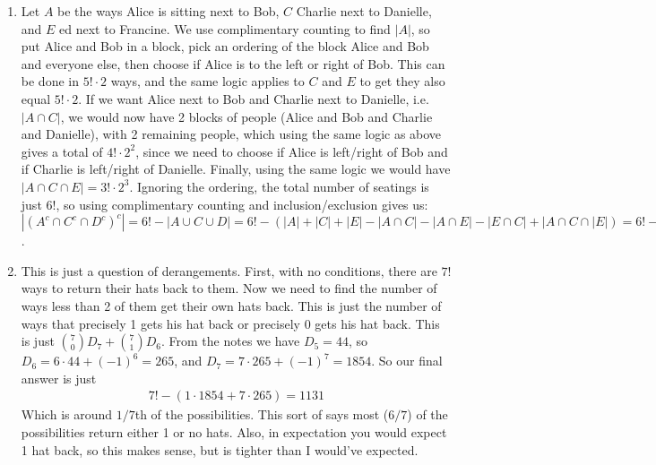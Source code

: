 \documentclass[12pt]{article}
\theoremstyle{definitionstyle}
\begin{document}
\begin{enumerate}[leftmargin=\labelsep]
		\item Let $A$ be the ways Alice is sitting next to Bob, $C$ Charlie next to Danielle, and $E$ ed next to Francine. We use complimentary counting to find $|A|$, so put Alice and Bob in a block, pick an ordering of the block Alice and Bob and everyone else, then choose if Alice is to the left or right of Bob. This can be done in $5! \cdot 2$ ways, and the same logic applies to $C$ and $E$ to get they also equal $5! \cdot 2$. If we want Alice next to Bob and Charlie next to Danielle, i.e. $|A \cap C|$, we would now have 2 blocks of people (Alice and Bob and Charlie and Danielle), with 2 remaining people, which using the same logic as above gives a total of $4! \cdot 2^2$, since we need to choose if Alice is left/right of Bob and if Charlie is left/right of Danielle. Finally, using the same logic we would have $|A \cap C \cap E| = 3! \cdot 2^3$. Ignoring the ordering, the total number of seatings is just $6!$, so using complimentary counting and inclusion/exclusion gives us:
		$|(A^c \cap C^c \cap D^c)^c| = 6! - |A \cup C \cup D| = 6! - (|A| + |C| + |E| - |A \cap C| - |A \cap E| - |E \cap C| + |A \cap C \cap |E|) = 6! - (3 \cdot 5! \cdot 2 - 3 \cdot 4! \cdot 2^2 + 3! \cdot 2^3) = 240$.
		
		\item This is just a question of derangements. First, with no conditions, there are $7!$ ways to return their hats back to them. Now we need to find the number of ways less than 2 of them get their own hats back. This is just the number of ways that precisely 1 gets his hat back or precisely 0 gets his hat back. This is just ${7 \choose 0}D_7 + {7 \choose 1}D_6$. From the notes we have $D_5 = 44$, so $D_6 = 6 \cdot 44 + (-1)^6 = 265$, and $D_7 = 7 \cdot 265 + (-1)^7 = 1854$. So our final answer is just
		\begin{align*}
			7! - (1 \cdot 1854 + 7 \cdot 265) = 1131
		\end{align*}
		Which is around $1/7$th of the possibilities. This sort of says most ($6/7$) of the possibilities return either 1 or no hats. Also, in expectation you would expect 1 hat back, so this makes sense, but is tighter than I would've expected.
		

\end{enumerate}
\end{document}
